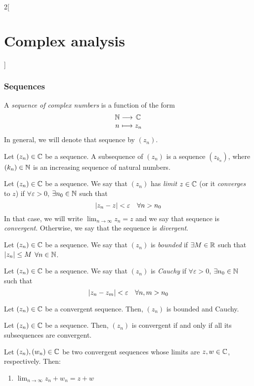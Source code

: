 \documentclass[../../../main_math.tex]{subfiles}
\begin{document}
\begin{multicols}{2}[\section{Complex analysis}]
  \subsubsection{Sequences}
  \begin{definition}
    A \emph{sequence of complex numbers} is a function of the form $$\function{}{\NN}{\CC}{n}{z_n}$$ In general, we will denote that sequence by $(z_n)$.
  \end{definition}
  \begin{definition}
    Let $(z_n)\in\mathbb{C}$ be a sequence. A subsequence of $(z_n)$ is a sequence $(z_{k_n})$, where $(k_n)\in\mathbb{N}$ is an increasing sequence of natural numbers.
  \end{definition}
  \begin{definition}
    Let $(z_n)\in\mathbb{C}$ be a sequence. We say that $(z_n)$ has \emph{limit} $z\in\mathbb{C}$ (or it \emph{converges} to $z$) if $\forall\varepsilon>0$, $\exists n_0\in\mathbb{N}$ such that $$\abs{z_n - z} < \varepsilon\quad \forall n > n_0$$ In that case, we will write $\displaystyle\lim_{n \to \infty} z_n = z$ and we say that sequence is \emph{convergent}. Otherwise, we say that the sequence is \emph{divergent}.
  \end{definition}
  \begin{definition}
    Let $(z_n)\in\mathbb{C}$ be a sequence. We say that $(z_n)$ is \emph{bounded} if $\exists M\in\mathbb{R}$ such that $\abs{z_n}\leq M$ $\forall n\in\mathbb{N}$.
  \end{definition}
  \begin{definition}
    Let $(z_n)\in\mathbb{C}$ be a sequence. We say that $(z_n)$ is \emph{Cauchy} if $\forall\varepsilon>0$, $\exists n_0\in\mathbb{N}$ such that $$\abs{z_n - z_m} < \varepsilon\quad \forall n,m > n_0$$
  \end{definition}
  \begin{proposition}
    Let $(z_n)\in\mathbb{C}$ be a convergent sequence. Then, $(z_n)$ is bounded and Cauchy.
  \end{proposition}
  \begin{proposition}
    Let $(z_n)\in\mathbb{C}$ be a sequence. Then, $(z_n)$ is convergent if and only if all its subsequences are convergent.
  \end{proposition}
  \begin{proposition}
    Let $(z_n),(w_n)\in\mathbb{C}$ be two convergent sequences whose limits are $z,w\in \mathbb{C}$, respectively. Then:
    \begin{enumerate}
      \item $\displaystyle\lim_{n\to\infty}z_n+w_n=z+w$

\end{enumerate}
\end{proposition}
\end{multicols}
\end{document}

